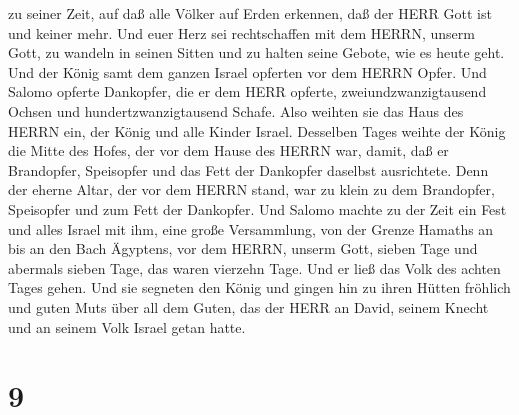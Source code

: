 zu seiner Zeit,  auf daß alle Völker auf Erden erkennen,
daß der HERR Gott ist und keiner mehr.  Und euer Herz sei
rechtschaffen mit dem HERRN, unserm Gott, zu wandeln in seinen Sitten
und zu halten seine Gebote, wie es heute geht.  Und der
König samt dem ganzen Israel opferten vor dem HERRN Opfer. 
Und Salomo opferte Dankopfer, die er dem HERR opferte,
zweiundzwanzigtausend Ochsen und hundertzwanzigtausend Schafe. Also
weihten sie das Haus des HERRN ein, der König und alle Kinder Israel.
 Desselben Tages weihte der König die Mitte des Hofes, der
vor dem Hause des HERRN war, damit, daß er Brandopfer, Speisopfer und
das Fett der Dankopfer daselbst ausrichtete. Denn der eherne Altar, der
vor dem HERRN stand, war zu klein zu dem Brandopfer, Speisopfer und zum
Fett der Dankopfer.  Und Salomo machte zu der Zeit ein Fest
und alles Israel mit ihm, eine große Versammlung, von der Grenze Hamaths
an bis an den Bach Ägyptens, vor dem HERRN, unserm Gott, sieben Tage und
abermals sieben Tage, das waren vierzehn Tage.  Und er ließ
das Volk des achten Tages gehen. Und sie segneten den König und gingen
hin zu ihren Hütten fröhlich und guten Muts über all dem Guten, das der
HERR an David, seinem Knecht und an seinem Volk Israel getan hatte.

\hypertarget{section-8}{%
\section{9}\label{section-8}}

